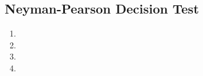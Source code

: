 \documentclass[11pt,a4paper]{article}
\begin{document}
\subsection{Neyman-Pearson Decision Test}

\begin{enumerate}[label=\roman*)]
\item
\item
\item
\item
\end{enumerate}

\subsection{}
\end{document}
